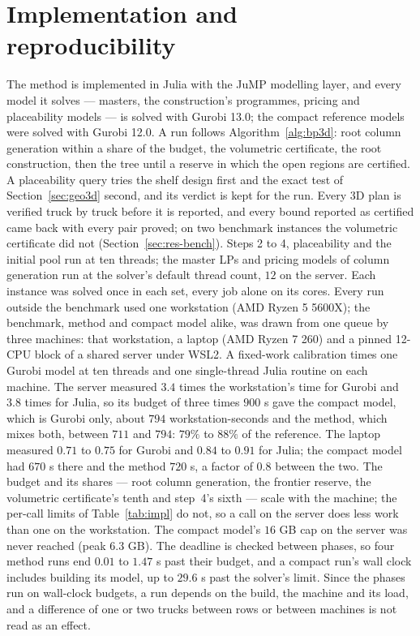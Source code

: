 \section{Implementation and reproducibility}
\label{appendix:impl}

The method is implemented in Julia with the JuMP modelling layer, and
every model it solves --- masters, the construction's programmes,
pricing and placeability models --- is solved with Gurobi 13.0; the
compact reference models were solved with Gurobi 12.0. A run follows
Algorithm~\ref{alg:bp3d}: root column generation within a share of the
budget, the volumetric certificate, the root construction, then the
tree until a reserve in which the open regions are certified. A
placeability query tries the shelf design first and the exact test of
Section~\ref{sec:geo3d} second, and its verdict is kept for the run.
Every 3D plan is verified truck by truck before it is reported, and
every bound reported as certified came back with every pair proved; on
two benchmark instances the volumetric certificate did not
(Section~\ref{sec:res-bench}). Steps 2 to 4, placeability and the
initial pool run at ten threads; the master LPs and pricing models of
column generation run at the solver's default thread count, $12$ on
the server. Each instance was solved once in each set, every job alone
on its cores. Every run outside the benchmark used one workstation
(AMD Ryzen 5 5600X); the benchmark, method and compact model alike, was
drawn from one queue by three machines: that workstation, a laptop
(AMD Ryzen 7 260) and a pinned 12-CPU block of a shared server under
WSL2. A fixed-work calibration times one Gurobi model at ten threads
and one single-thread Julia routine on each machine. The server measured
$3.4$ times the workstation's time for Gurobi and $3.8$ times for Julia,
so its budget of three times $900$ s gave the compact model, which is
Gurobi only, about $794$ workstation-seconds and the method, which mixes
both, between $711$ and $794$: $79\%$ to $88\%$ of the reference. The
laptop measured $0.71$ to $0.75$ for Gurobi and $0.84$ to $0.91$ for
Julia; the compact model had $670$ s there and the method $720$ s, a
factor of $0.8$ between the two. The budget and its shares --- root
column generation, the frontier reserve, the volumetric certificate's
tenth and step~4's sixth --- scale with the machine; the per-call limits
of Table~\ref{tab:impl} do not, so a call on the server does less work
than one on the workstation. The compact model's $16$ GB cap on the
server was never reached (peak $6.3$ GB). The deadline is checked
between phases, so four method runs end $0.01$ to $1.47$ s past their
budget, and a compact run's wall clock includes building its model, up
to $29.6$ s past the solver's limit. Since the phases run on wall-clock
budgets, a run depends on the build, the machine and its load, and a
difference of one or two trucks between rows or between machines is not
read as an effect.

